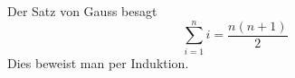 Der Satz von Gauss besagt
    \[ \sum_{i=1}^n i = \frac{n(n+1)}{2} \]
Dies beweist man per Induktion.
